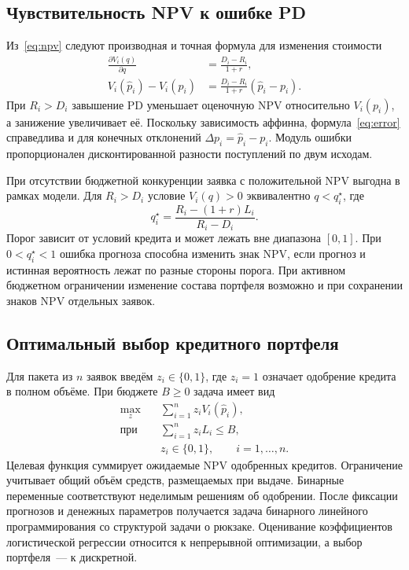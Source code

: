 \documentclass{misisarticle}
\begin{document}
\subsection{Чувствительность NPV к ошибке PD}

Из~\eqref{eq:npv} следуют производная и точная формула для изменения стоимости
\begin{align}
  \frac{\partial V_i(q)}{\partial q}
     &=\frac{D_i-R_i}{1+r}, \label{eq:derivative}\\
  V_i(\hat p_i)-V_i(p_i)
     &=\frac{D_i-R_i}{1+r}(\hat p_i-p_i).
     \label{eq:error}
\end{align}
При $R_i>D_i$ завышение PD уменьшает оценочную NPV относительно $V_i(p_i)$, а занижение увеличивает её. Поскольку зависимость аффинна, формула~\eqref{eq:error} справедлива и для конечных отклонений $\Delta p_i=\hat p_i-p_i$. Модуль ошибки пропорционален дисконтированной разности поступлений по двум исходам.

При отсутствии бюджетной конкуренции заявка с положительной NPV выгодна в рамках модели. Для $R_i>D_i$ условие $V_i(q)>0$ эквивалентно $q<q_i^\star$, где
\begin{equation}
  q_i^\star=\frac{R_i-(1+r)L_i}{R_i-D_i}.
  \label{eq:threshold}
\end{equation}
Порог зависит от условий кредита и может лежать вне диапазона $[0,1]$. При $0<q_i^\star<1$ ошибка прогноза способна изменить знак NPV, если прогноз и истинная вероятность лежат по разные стороны порога. При активном бюджетном ограничении изменение состава портфеля возможно и при сохранении знаков NPV отдельных заявок.

\subsection{Оптимальный выбор кредитного портфеля}

Для пакета из $n$ заявок введём $z_i\in\{0,1\}$, где $z_i=1$ означает одобрение кредита в полном объёме. При бюджете $B\geq0$ задача имеет вид
\begin{equation}
  \begin{aligned}
    \max_{z}\quad &\sum_{i=1}^{n}z_i V_i(\hat p_i),\\
    \text{при}\quad &\sum_{i=1}^{n}z_i L_i\le B,\\
    &z_i\in\{0,1\},\qquad i=1,\ldots,n .
  \end{aligned}
  \label{eq:knapsack}
\end{equation}
Целевая функция суммирует ожидаемые NPV одобренных кредитов. Ограничение учитывает общий объём средств, размещаемых при выдаче. Бинарные переменные соответствуют неделимым решениям об одобрении. После фиксации прогнозов и денежных параметров получается задача бинарного линейного программирования со структурой задачи о рюкзаке. Оценивание коэффициентов логистической регрессии относится к непрерывной оптимизации, а выбор портфеля~--- к дискретной.
\end{document}
